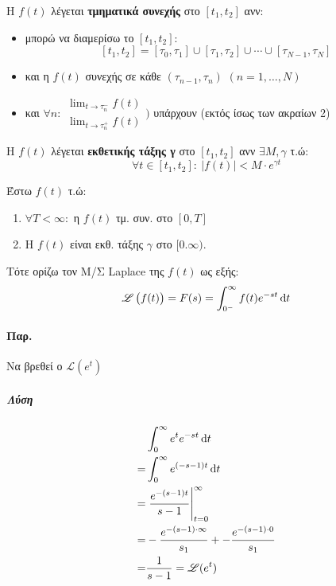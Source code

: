 \documentclass[11pt,a4paper,titlepage,final]{article}
\begin{document}
\begin{defn*}{}
Η $f(t)$ λέγεται \textbf{τμηματικά συνεχής} στο $[t_1,t_2]$ ανν:
\begin{itemize}
\item μπορώ να διαμερίσω το $[t_1,t_2]$:
\[
[t_1,t_2]=[\tau_0,\tau_1]\cup[\tau_1,\tau_2]\cup\cdots\cup[\tau_{N-1},\tau_N]
\]
\item και η $f(t)$ συνεχής σε κάθε $(\tau_{n-1},\tau_n)$ $(n=1,\dots,N)$
\item και \(\forall n: \begin{matrix}
\lim_{t\to\tau_n^-}f(t)\\
\lim_{t\to\tau_n^+}f(t)
\end{matrix})
\) υπάρχουν (εκτός ίσως των ακραίων 2)
\end{itemize}
\end{defn*}

\begin{defn*}{}
Η \(f(t)\) λέγεται \textbf{εκθετικής τάξης γ} στο $[t_1,t_2]$ ανν \(\exists M,\gamma\) τ.ώ:
\[
\forall t \in [t_1,t_2]:\ \left|f(t)\right|<M\cdot e^{\gamma t}
\]
\end{defn*}

\begin{defn*}{}
Έστω $f(t)$ τ.ώ:
\begin{enumerate}
\item \(\forall T<\infty: \) η $f(t)$ τμ. συν. στο \([0,T]\)
\item Η $f(t)$ είναι εκθ. τάξης $\gamma$ στο \([0.\infty)\).
\end{enumerate}

Τότε ορίζω τον Μ/Σ \textlatin{Laplace} της $f(t)$ ως εξής:
\[
\mathscr{L}\left(f(t)\right) = F(s)=\int_{0^-}^\infty f(t)e^{-st}\dif t
\]
\end{defn*}

\paragraph{Παρ.}
Να βρεθεί ο $\mathscr{L}(e^t)$
\subparagraph{Λύση}
\begin{align*}
&\int_0^\infty e^te^{-st}\dif t\\
=&\int_0^\infty e^{(-s-1)t} \dif t\\
=& \left. \frac{e^{-(s-1)t}}{s-1}\right|_{t=0}^\infty\\
=&-\frac{e^{-(s-1)\cdot\infty}}{s_1}+-\frac{e^{-(s-1)\cdot0}}{s_1}\\
=&\frac{1}{s-1}=\mathscr{L}(e^t)
\end{align*}
\end{document}

